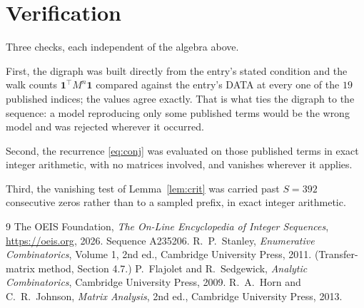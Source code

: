 \documentclass[11pt,a4paper]{article}
\theoremstyle{plain}
\theoremstyle{definition}
\begin{document}
\section{Verification}

Three checks, each independent of the algebra above.

First, the digraph was built directly from the entry's stated condition and the walk counts
$\mathbf{1}^{\!\top}M^{n}\mathbf{1}$ compared against the entry's DATA at every one of
the $19$ published indices; the values agree exactly. That is what ties the digraph to
the sequence: a model reproducing only some published terms would be the wrong model and
was rejected wherever it occurred.

Second, the recurrence \eqref{eq:conj} was evaluated on those published terms in exact
integer arithmetic, with no matrices involved, and vanishes wherever it applies.

Third, the vanishing test of Lemma~\ref{lem:crit} was carried past $S=392$ consecutive
zeros rather than to a sampled prefix, in exact integer arithmetic.

\begin{thebibliography}{9}
 The OEIS Foundation, \emph{The On-Line Encyclopedia of Integer
Sequences}, \url{https://oeis.org}, 2026. Sequence A235206.
 R.~P.~Stanley, \emph{Enumerative Combinatorics}, Volume 1, 2nd ed.,
Cambridge University Press, 2011. (Transfer-matrix method, Section 4.7.)
 P.~Flajolet and R.~Sedgewick, \emph{Analytic Combinatorics}, Cambridge
University Press, 2009.
 R.~A.~Horn and C.~R.~Johnson, \emph{Matrix Analysis}, 2nd ed., Cambridge
University Press, 2013.
\end{thebibliography}
\end{document}
